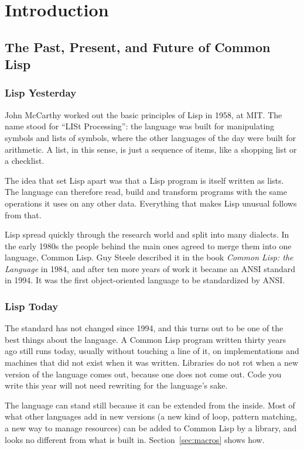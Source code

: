 \chapter{Introduction}

\section{The Past, Present, and Future of Common Lisp}

\subsection{Lisp Yesterday}

John McCarthy worked out the basic principles of Lisp in 1958, at
MIT. The name stood for ``LISt Processing'': the language was built
for manipulating symbols and lists of symbols, where the other
languages of the day were built for arithmetic. A list, in this
sense, is just a sequence of items, like a shopping list or a
checklist.

The idea that set Lisp apart was that a Lisp program is itself written
as lists. The language can therefore read, build and transform
programs with the same operations it uses on any other data. Everything
that makes Lisp unusual follows from that.

Lisp spread quickly through the research world and split into many
dialects. In the early 1980s the people behind the main ones agreed to
merge them into one language, Common Lisp. Guy Steele described it in
the book \emph{Common Lisp: the Language} in 1984, and after ten more
years of work it became an ANSI standard in 1994. It was the first
object-oriented language to be standardized by ANSI.

\subsection{Lisp Today}

The standard has not changed since 1994, and this turns out to be one
of the best things about the language. A Common Lisp program written
thirty years ago still runs today, usually without touching a line of
it, on implementations and machines that did not exist when it was
written. Libraries do not rot when a new version of the language
comes out, because one does not come out. Code you write this year
will not need rewriting for the language's sake.

The language can stand still because it can be extended from the
inside. Most of what other languages add in new versions (a new kind
of loop, pattern matching, a new way to manage resources) can be added
to Common Lisp by a library, and looks no different from what is built
in. Section~\ref{sec:macros} shows how.


